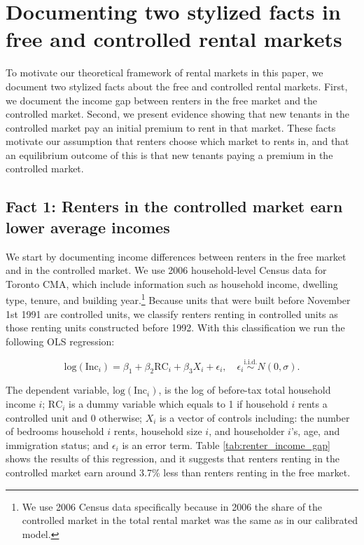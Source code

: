 \documentclass[parskip=full]{article}
\begin{document}
\section{Documenting two stylized facts in free and controlled rental markets}\label{sec:evidence}

To motivate our theoretical framework of rental markets in this paper, we document two stylized facts about the free and controlled rental markets. First, we document the income gap between renters in the free market and the controlled market. Second, we present evidence showing that new tenants in the controlled market pay an initial premium to rent in that market. These facts motivate our assumption that renters choose which market to rents in, and that an equilibrium outcome of this is that new tenants paying a premium in the controlled market.

\subsection{Fact 1: Renters in the controlled market earn lower average incomes}\label{sec:income_gap}

We start by documenting income differences between renters in the free market and in the controlled market. We use 2006 household-level Census data for Toronto CMA, which include information  such as household income, dwelling type, tenure, and building year.\footnote{We use 2006 Census data specifically because in 2006 the share of the controlled market in the total rental market was the same as in our calibrated model.} Because units that were built before November 1st 1991 are controlled units, we classify renters renting in controlled units as those renting units constructed before 1992. With this classification we run the following OLS regression:

\begin{equation}\label{eq:renters_income_gap}
  \mbox{log}(\mbox{Inc}_{i}) = \beta_{1} + \beta_{2}\mbox{RC}_{i}+\beta_{3}X_{i}+\epsilon_{i}, \quad \epsilon_{i}\overset{\mathrm{i.i.d.}}\sim N(0,\sigma).
\end{equation}

\noindent The dependent variable, $\mbox{log}(\mbox{Inc}_{i})$, is the log of before-tax total household income $i$; $\mbox{RC}_{i}$ is a dummy variable which equals to 1 if household $i$ rents a controlled unit and 0 otherwise; $X_{i}$ is a vector of controls including: the number of bedrooms household $i$ rents, household size $i$, and householder $i$'s, age, and immigration status; and $\epsilon_{i}$ is an error term. Table \ref{tab:renter_income_gap} shows the results of this regression, and it suggests that renters renting in the controlled market earn around 3.7\% less than renters renting in the free market.
\end{document}
